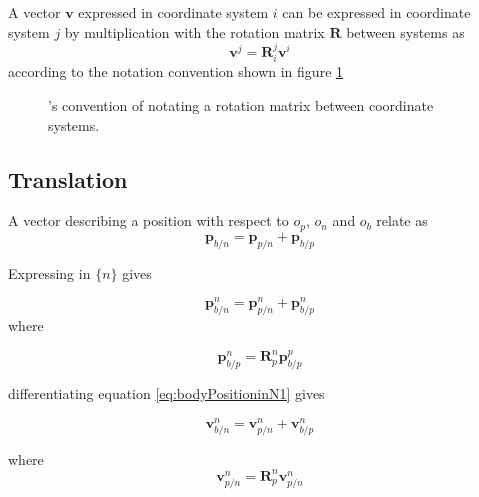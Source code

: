 A vector $\textbf{v}$ expressed in coordinate system $i$ can be expressed in coordinate system $j$ by multiplication with the rotation matrix $\textbf{R}$ between systems as
\begin{equation}
\textbf{v}^{j} = \textbf{R}_{i}^{j} \textbf{v}^{i}
\end{equation}
according to the notation convention shown in figure \ref{fig:fossenRotationMatrixNotation}
\begin{figure}[H]
	\centering
	\caption{\citet{fossen2011handbook}'s convention of notating a rotation matrix between coordinate systems.}
	\label{fig:fossenRotationMatrixNotation}
\end{figure}

\subsection{Translation}
A vector describing a position with respect to $o_{p}$, $o_{n}$ and $o_{b}$ relate as 
\begin{equation}
\textbf{p}_{b/n} = \textbf{p}_{p/n} + \textbf{p}_{b/p} 
\end{equation}

Expressing in $\{n\}$ gives

\begin{equation}
\textbf{p}_{b/n}^{n} = \textbf{p}_{p/n}^{n} + \textbf{p}_{b/p}^{n} 
\label{eq:bodyPositioninN1}
\end{equation}
where 

\begin{equation}
\textbf{p}_{b/p}^{n} = \textbf{R}_{p}^{n}\textbf{p}_{b/p}^{p}
\end{equation}

differentiating equation \ref{eq:bodyPositioninN1} gives

\begin{equation}
\textbf{v}_{b/n}^{n} = \textbf{v}_{p/n}^{n} + \textbf{v}_{b/p}^{n} 
\label{ModuleSpeedExpressedInN1}
\end{equation}

where 
\begin{equation}
 \textbf{v}_{p/n}^{n} = \textbf{R}_{p}^{n} \textbf{v}_{p/n}^{n}
\end{equation}

